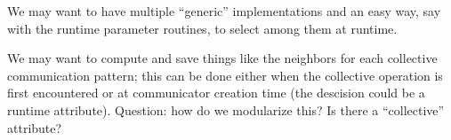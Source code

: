 We may want to have multiple ``generic'' implementations and an easy
way, say with the runtime parameter routines, to select among them at runtime.

We may want to compute and save things like the neighbors for each
collective communication pattern; this can be done either when the
collective operation is first encountered or at communicator creation
time (the descision could be a runtime attribute).  Question: how do
we modularize this?  Is there a ``collective'' 
attribute?

